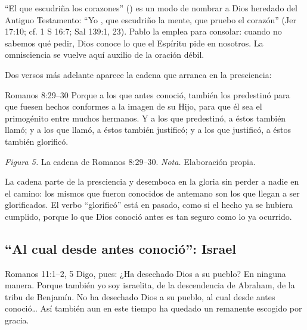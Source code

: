 ``El que escudriña los corazones'' () es un modo de nombrar a Dios heredado del Antiguo Testamento: ``Yo \SENOR{}, que escudriño la mente, que pruebo el corazón'' (Jer 17:10; cf. 1 S 16:7; Sal 139:1, 23). Pablo la emplea para consolar: cuando no sabemos qué pedir, Dios conoce lo que el Espíritu pide en nosotros. La omnisciencia se vuelve aquí auxilio de la oración débil.

Dos versos más adelante aparece la cadena que arranca en la presciencia:

\begin{verso}{Romanos 8:29–30}
Porque a los que antes conoció, también los predestinó para que fuesen hechos conformes a la imagen de su Hijo, para que él sea el primogénito entre muchos hermanos. Y a los que predestinó, a éstos también llamó; y a los que llamó, a éstos también justificó; y a los que justificó, a éstos también glorificó.
\end{verso}

\begin{center}
\par
{\footnotesize\color{gris}\textit{Figura 5.} La cadena de Romanos 8:29--30. \textit{Nota.} Elaboración propia.}
\end{center}

La cadena parte de la presciencia y desemboca en la gloria sin perder a nadie en el camino: los mismos que fueron conocidos de antemano son los que llegan a ser glorificados. El verbo ``glorificó'' está en pasado, como si el hecho ya se hubiera cumplido, porque lo que Dios conoció antes es tan seguro como lo ya ocurrido.

\subsection{“Al cual desde antes conoció”: Israel}

\begin{verso}{Romanos 11:1–2, 5}
Digo, pues: ¿Ha desechado Dios a su pueblo? En ninguna manera. Porque también yo soy israelita, de la descendencia de Abraham, de la tribu de Benjamín. No ha desechado Dios a su pueblo, al cual desde antes conoció\ldots{} Así también aun en este tiempo ha quedado un remanente escogido por gracia.
\end{verso}

